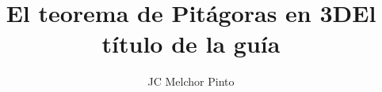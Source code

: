 \documentclass[12pt,addpoints,answers]{guia}
\title{El teorema de Pitágoras en 3D}
\title{El título de la guía}
\author{JC Melchor Pinto}
\begin{document}
\pagestyle{headandfoot}

\INFO
\printanswers
\vspace{-0.5cm}
\begin{multicols}{2}
    
    
    \columnbreak
    
\end{multicols}
\begin{questions}
    \questionboxed[10]{}
    \questionboxed[10]{}
    \questionboxed[10]{}
    \questionboxed[10]{}
    \questionboxed[10]{}
    \questionboxed[10]{}
    \questionboxed[10]{}
    \questionboxed[10]{}
    \questionboxed[10]{}
    \questionboxed[10]{}
\end{questions}
\end{document}
